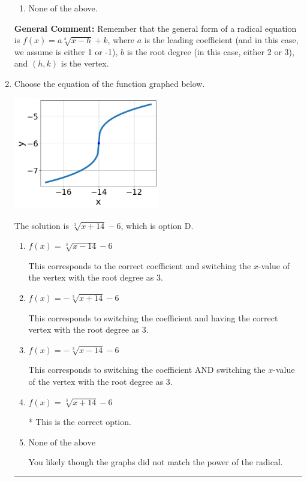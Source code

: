 \documentclass{extbook}[14pt]
\newcommand{\litem}[1]{\item #1

\rule{\textwidth}{0.4pt}}
\begin{document}
\begin{enumerate}
{\begin{enumerate}[label=\Alph*.]
\begin{multicols}{2}
\end{multicols}\item None of the above.\end{enumerate}
\textbf{General Comment:} Remember that the general form of a radical equation is $ f(x) = a \sqrt[b]{x - h} + k $, where $a$ is the leading coefficient (and in this case, we assume is either 1 or -1), $b$ is the root degree (in this case, either 2 or 3), and $(h, k)$ is the vertex.
}
\litem{
Choose the equation of the function graphed below.

\begin{center}
    \includegraphics[width=0.5\textwidth]{../Figures/radicalGraphToEquationCopyC.png}
\end{center}



The solution is \( \sqrt[3]{x + 14} - 6 \), which is option D.\begin{enumerate}[label=\Alph*.]
\item \( f(x) = \sqrt[3]{x - 14} - 6 \)

This corresponds to the correct coefficient and switching the $x$-value of the vertex with the root degree as $3$.
\item \( f(x) = - \sqrt[3]{x + 14} - 6 \)

This corresponds to switching the coefficient and having the correct vertex with the root degree as $3$.
\item \( f(x) = - \sqrt[3]{x - 14} - 6 \)

This corresponds to switching the coefficient AND switching the $x$-value of the vertex with the root degree as $3$.
\item \( f(x) = \sqrt[3]{x + 14} - 6 \)

* This is the correct option.
\item \( \text{None of the above} \)

You likely though the graphs did not match the power of the radical.
\end{enumerate}

}
\end{enumerate}
\end{document}
